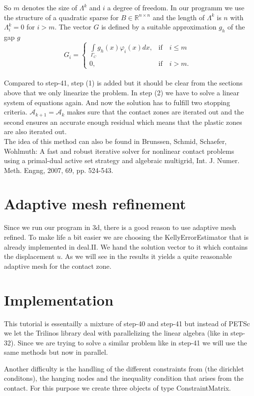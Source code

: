 \documentclass{article}
\begin{document}
So $m$ denotes the size of $\Lambda^k$ and $i$ a degree of freedom. In our
programm we use the structure of a quadratic sparse for $B\in\mathbb{R}^{n\times
n}$ and the length of $\Lambda^k$ is $n$ with $\Lambda^k_i = 0$ for $i>m$.
The vector $G$ is defined by a suitable approximation $g_h$ of the gap $g$
$$G_i = \begin{cases}
\int\limits_{\Gamma_C}g_h(x)\varphi_i(x)dx, & \text{if}\quad i\leq m\\
0, & \text{if}\quad i>m.
\end{cases}$$\\
Compared to step-41, step (1) is added but it should be clear
from the sections above that we only linearize the problem. In step (2) we have to solve a linear
system of equations again. And now the solution has to fulfill two stopping
criteria. $\mathcal{A}_{k+1} = \mathcal{A}_k$ makes sure that the contact zones are iterated out and the second ensures an accurate enough residual which means
that the plastic zones are also iterated out.\\
The idea of this method can also be found in Brunssen, Schmid, Schaefer,
Wohlmuth: A fast and robust iterative solver for nonlinear contact problems
using a primal-dual active set strategy and algebraic multigrid, Int. J. Numer.
Meth. Engng, 2007, 69, pp. 524-543.

\section{Adaptive mesh refinement}

Since we run our program in 3d, there is a good reason to use adaptive
mesh refined. To make life a bit easier we are choosing the
KellyErrorEstimator that is already implemented in deal.II. We hand the
solution vector to it which contains the displacement $u$. As we will see in the
results it yields a quite reasonable adaptive mesh for the contact zone.

\section{Implementation}

This tutorial is essentailly a mixture of step-40 and step-41 but instead of
PETSc we let the Trilinos library deal with parallelizing the linear algebra
(like in step-32). Since we are trying to solve a similar problem like in 
step-41 we will use the same methods but now in parallel.

Another difficulty is the handling of the different constraints from
(the dirichlet conditons), the hanging nodes and the inequality condition that 
arises from the contact. For this purpose we create three objects of type 
ConstraintMatrix.
\end{document}
